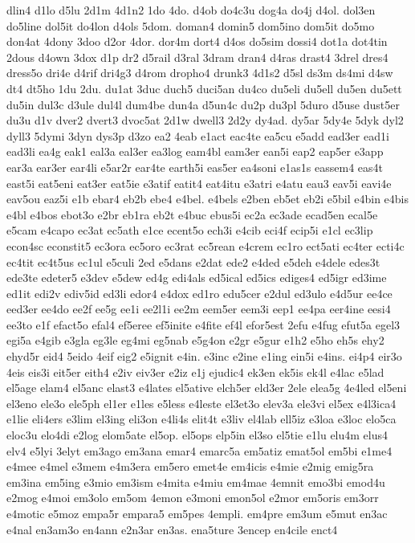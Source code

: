{dlin4
d1lo
d5lu
2d1m
4d1n2
1do
4do.
d4ob
do4c3u
dog4a
do4j
d4ol.
dol3en
do5line
dol5it
do4lon
d4ols
5dom.
doman4
domin5
dom5ino
dom5it
do5mo
don4at
4dony
3doo
d2or
4dor.
dor4m
dort4
d4os
do5sim
dossi4
dot1a
dot4tin
2dous
d4own
3dox
d1p
dr2
d5rail
d3ral
3dram
dran4
d4ras
drast4
3drel
dres4
dress5o
dri4e
d4rif
dri4g3
d4rom
dropho4
drunk3
4d1s2
d5sl
ds3m
ds4mi
d4sw
dt4
dt5ho
1du
2du.
du1at
3duc
duch5
duci5an
du4co
du5eli
du5ell
du5en
du5ett
du5in
dul3c
d3ule
dul4l
dum4be
dun4a
d5un4c
du2p
du3pl
5duro
d5use
dust5er
du3u
d1v
dver2
dvert3
dvoc5at
2d1w
dwell3
2d2y
dy4ad.
dy5ar
5dy4e
5dyk
dyl2
dyll3
5dymi
3dyn
dys3p
d3zo
ea2
4eab
e1act
eac4te
ea5cu
e5add
ead3er
ead1i
ead3li
ea4g
eak1
eal3a
eal3er
ea3log
eam4bl
eam3er
ean5i
eap2
eap5er
e3app
ear3a
ear3er
ear4li
e5ar2r
ear4te
earth5i
eas5er
ea4soni
e1as1s
eassem4
eas4t
east5i
eat5eni
eat3er
eat5ie
e3atif
eatit4
eat4itu
e3atri
e4atu
eau3
eav5i
eavi4e
eav5ou
eaz5i
e1b
ebar4
eb2b
ebe4
e4bel.
e4bels
e2ben
eb5et
eb2i
e5bil
e4bin
e4bis
e4bl
e4bos
ebot3o
e2br
eb1ra
eb2t
e4buc
ebus5i
ec2a
ec3ade
ecad5en
ecal5e
e5cam
e4capo
ec3at
ec5ath
e1ce
ecent5o
ech3i
e4cib
eci4f
ecip5i
e1cl
ec3lip
econ4sc
econstit5
ec3ora
ec5oro
ec3rat
ec5rean
e4crem
ec1ro
ect5ati
ec4ter
ecti4c
ec4tit
ec4t5us
ec1ul
e5culi
2ed
e5dans
e2dat
ede2
e4ded
e5deh
e4dele
edes3t
ede3te
edeter5
e3dev
e5dew
ed4g
edi4als
ed5ical
ed5ics
ediges4
ed5igr
ed3ime
ed1it
edi2v
ediv5id
ed3li
edor4
e4dox
ed1ro
edu5cer
e2dul
ed3ulo
e4d5ur
ee4ce
eed3er
ee4do
ee2f
ee5g
ee1i
ee2l1i
ee2m
eem5er
eem3i
eep1
ee4pa
eer4ine
eesi4
ee3to
e1f
efact5o
efal4
ef5eree
ef5inite
e4fite
ef4l
efor5est
2efu
e4fug
efut5a
egel3
egi5a
e4gib
e3gla
eg3le
eg4mi
eg5nab
e5g4on
e2gr
e5gur
e1h2
e5ho
eh5s
ehy2
ehyd5r
eid4
5eido
4eif
eig2
e5ignit
e4in.
e3inc
e2ine
e1ing
ein5i
e4ins.
ei4p4
eir3o
4eis
eis3i
eit5er
eith4
e2iv
eiv3er
e2iz
e1j
ejudic4
ek3en
ek5is
ek4l
e4lac
e5lad
el5age
elam4
el5anc
elast3
e4lates
el5ative
elch5er
eld3er
2ele
elea5g
4e4led
el5eni
el3eno
ele3o
ele5ph
el1er
e1les
e5less
e4leste
el3et3o
elev3a
ele3vi
el5ex
e4l3ica4
e1lie
eli4ers
e3lim
el3ing
eli3on
e4li4s
elit4t
e3liv
el4lab
ell5iz
e3loa
e3loc
elo5ca
eloc3u
elo4di
e2log
elom5ate
el5op.
el5ops
elp5in
el3so
el5tie
e1lu
elu4m
elus4
elv4
e5lyi
3elyt
em3ago
em3ana
emar4
emarc5a
em5atiz
emat5ol
em5bi
e1me4
e4mee
e4mel
e3mem
e4m3era
em5ero
emet4e
em4icis
e4mie
e2mig
emig5ra
em3ina
em5ing
e3mio
em3ism
e4mita
e4miu
em4mae
4emnit
emo3bi
emod4u
e2mog
e4moi
em3olo
em5om
4emon
e3moni
emon5ol
e2mor
em5oris
em3orr
e4motic
e5moz
empa5r
empara5
em5pes
4empli.
em4pre
em3um
e5mut
en3ac
e4nal
en3am3o
en4ann
e2n3ar
en3as.
ena5ture
3encep
en4cile
enct4
}
